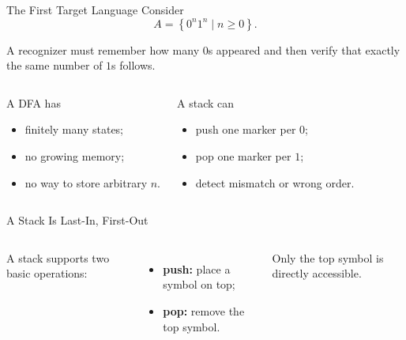 \documentclass[aspectratio=169,10pt]{beamer}
\newcommand{\lang}[1]{\left\{#1\right\}}
\begin{document}
\begin{frame}{The First Target Language}
Consider
\[
A=\lang{0^n1^n\mid n\ge 0}.
\]

A recognizer must remember how many $0$s appeared and then verify that exactly the same number of $1$s follows.

\vspace{0.8em}
\begin{columns}[T,onlytextwidth]
\begin{block}{A DFA has}
\begin{itemize}
    \item finitely many states;
    \item no growing memory;
    \item no way to store arbitrary $n$.
\end{itemize}
\end{block}

\begin{exampleblock}{A stack can}
\begin{itemize}
    \item push one marker per $0$;
    \item pop one marker per $1$;
    \item detect mismatch or wrong order.
\end{itemize}
\end{exampleblock}
\end{columns}
\end{frame}

\begin{frame}{A Stack Is Last-In, First-Out}
\begin{columns}[c,onlytextwidth]
A stack supports two basic operations:

\begin{itemize}
    \item \textbf{push:} place a symbol on top;
    \item \textbf{pop:} remove the top symbol.
\end{itemize}

\vspace{0.8em}
Only the top symbol is directly accessible.

\centering
{}
\end{columns}
\end{frame}
\end{document}

